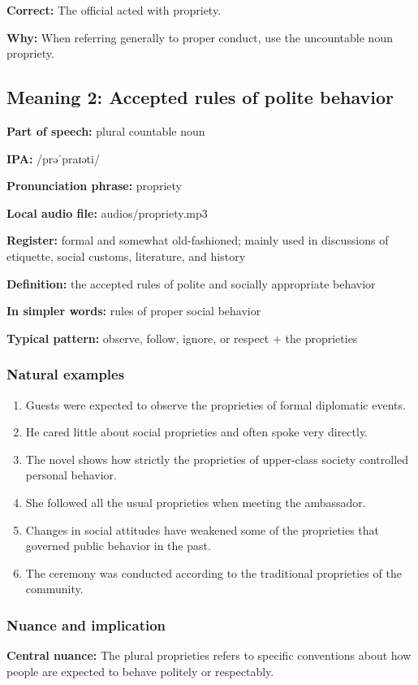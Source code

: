 \documentclass[11pt]{article}
\begin{document}
\textbf{Correct:} The official acted with propriety.

\textbf{Why:} When referring generally to proper conduct, use the uncountable noun propriety.

\subsection{Meaning 2: Accepted rules of polite behavior}
\textbf{Part of speech:} plural countable noun

\textbf{IPA:} /prəˈpraɪəti/

\textbf{Pronunciation phrase:} propriety

\textbf{Local audio file:} audios/propriety.mp3

\textbf{Register:} formal and somewhat old-fashioned; mainly used in discussions of etiquette, social customs, literature, and history

\textbf{Definition:} the accepted rules of polite and socially appropriate behavior

\textbf{In simpler words:} rules of proper social behavior

\textbf{Typical pattern:} observe, follow, ignore, or respect + the proprieties

\subsubsection{Natural examples}
\begin{enumerate}
  \item Guests were expected to observe the proprieties of formal diplomatic events.
  \item He cared little about social proprieties and often spoke very directly.
  \item The novel shows how strictly the proprieties of upper-class society controlled personal behavior.
  \item She followed all the usual proprieties when meeting the ambassador.
  \item Changes in social attitudes have weakened some of the proprieties that governed public behavior in the past.
  \item The ceremony was conducted according to the traditional proprieties of the community.
\end{enumerate}

\subsubsection{Nuance and implication}
\textbf{Central nuance:} The plural proprieties refers to specific conventions about how people are expected to behave politely or respectably.
\end{document}
